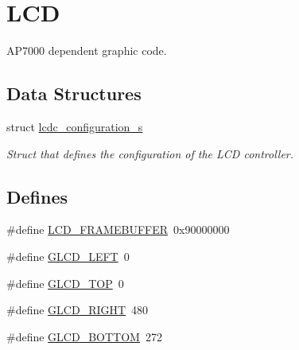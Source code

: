 \hypertarget{group__ap7000__lcd}{
\section{LCD}
\label{group__ap7000__lcd}
}
AP7000 dependent graphic code.  


\subsection*{Data Structures}
\begin{CompactItemize}
\item 
struct \hyperlink{structlcdc__configuration__s}{lcdc\_\-configuration\_\-s}
\begin{CompactList}\small\item\em Struct that defines the configuration of the LCD controller. \item\end{CompactList}\end{CompactItemize}
\subsection*{Defines}
\begin{CompactItemize}
\item 
\#define \hyperlink{group__ap7000__lcd_gcf3edd4d44a99cff73b884e9ab496718}{LCD\_\-FRAMEBUFFER}~0x90000000
\item 
\#define \hyperlink{group__ap7000__lcd_g4a20e62f00af437f0751229dbe5f155c}{GLCD\_\-LEFT}~0
\item 
\#define \hyperlink{group__ap7000__lcd_gf2ee96404297ed47a1437012251aaf08}{GLCD\_\-TOP}~0
\item 
\#define \hyperlink{group__ap7000__lcd_g159d4b69cc8ba37f5e689e1ca132add6}{GLCD\_\-RIGHT}~480
\item 
\#define \hyperlink{group__ap7000__lcd_g5472b3d9706ac3335f1f22b0cdd6d18f}{GLCD\_\-BOTTOM}~272
\end{CompactItemize}
